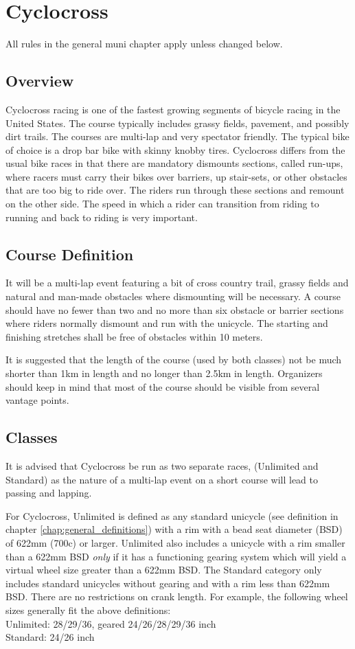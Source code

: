 \chapter{Cyclocross \label{chap:cyclocross} \setcounter{chapter}{1}}

All rules in the general muni chapter apply unless changed below.

\section{Overview}
Cyclocross racing is one of the fastest growing segments of bicycle racing in the United States.
The course typically includes grassy fields, pavement, and possibly dirt trails.
The courses are multi-lap and very spectator friendly.
The typical bike of choice is a drop bar bike with skinny knobby tires.
Cyclocross differs from the usual bike races in that there are mandatory dismounts sections, called run-ups, where racers must carry their bikes over barriers, up stair-sets, or other obstacles that are too big to ride over.
The riders run through these sections and remount on the other side.
The speed in which a rider can transition from riding to running and back to riding is very important.

\section{Course Definition}
It will be a multi-lap event featuring a bit of cross country trail, grassy fields and natural and man-made obstacles where dismounting will be necessary.
A course should have no fewer than two and no more than six obstacle or barrier sections where riders normally dismount and run with the unicycle.
The starting and finishing stretches shall be free of obstacles within 10 meters.

It is suggested that the length of the course (used by both classes) not be much shorter than 1km in length and no longer than 2.5km in length. 
Organizers should keep in mind that most of the course should be visible from several vantage points.

\section{Classes}
It is advised that Cyclocross be run as two separate races, (Unlimited and Standard) as the nature of a multi-lap event on a short course will lead to passing and lapping.

For Cyclocross, Unlimited is defined as any standard unicycle (see definition in chapter \ref{chap:general_definitions}) with a rim with a bead seat diameter (BSD) of 622mm (700c) or larger.
Unlimited also includes a unicycle with a rim smaller than a 622mm BSD {\em only} if it has a functioning gearing system which will yield a virtual wheel size greater than a 622mm BSD.
The Standard category only includes standard unicycles without gearing and with a rim less than 622mm BSD.
There are no restrictions on crank length.
For example, the following wheel sizes generally fit the above definitions: \\
Unlimited: 28/29/36, geared 24/26/28/29/36 inch \\
Standard: 24/26 inch

